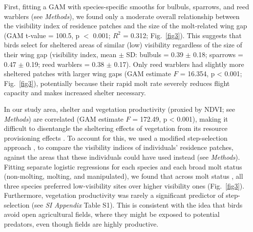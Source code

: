 \begin{refsection}
First, fitting a GAM with species-specific smooths for bulbuls, sparrows, and reed warblers (see \textit{Methods}), we found only a moderate overall relationship between the visibility index of residence patches and the size of the molt-related wing gap (GAM t-value = 100.5, p $<$ 0.001; $R^2$ = 0.312; Fig.~\ref{fig3}).
This suggests that birds select for sheltered areas of similar (low) visibility regardless of the size of their wing gap (visibility index, mean $\pm$ SD: bulbuls =  0.39 $\pm$ 0.18; sparrows = 0.47 $\pm$ 0.19; reed warblers = 0.38 $\pm$ 0.17).
Only reed warblers had slightly more sheltered patches with larger wing gaps (GAM estimate $F$ = 16.354, p < 0.001; Fig.~\ref{fig3}), potentially because their rapid molt rate severely reduces flight capacity and makes increased shelter necessary.

In our study area, shelter and vegetation productivity (proxied by NDVI; see \textit{Methods}) are correlated (GAM estimate $F$ = 172.49, p < 0.001), making it difficult to disentangle the sheltering effects of vegetation from its resource provisioning effects \cite{pettorelli2011}.
To account for this, we used a modified step-selection approach \cite{avgar2016,signer2019,aben2021}, to compare the visibility indices of individuals' residence patches, against the areas that these individuals could have used instead (see \textit{Methods}).
Fitting separate logistic regressions for each species and each broad molt status (non-molting, molting, and manipulated), we found that across molt status , all three species preferred low-visibility sites over higher visibility ones (Fig.~\ref{fig3}).
Furthermore, vegetation productivity was rarely a significant predictor of step-selection (see \textit{SI Appendix} Table {S1}).
This is consistent with the idea that birds avoid open agricultural fields, where they might be exposed to potential predators, even though fields are highly productive.


\end{refsection}
